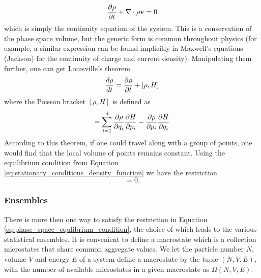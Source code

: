 \begin{equation}
  \frac{\partial \rho}{\partial t} + \nabla \cdot \rho {\bf v} = 0
\end{equation}
which is simply the continuity equation of the system. This is a conservation of the phase space volume, but the generic form is common throughout physics (for example, a similar expression can be found implicitly in Maxwell's equations (\cf Jackson\cite[page 3]{jackson_classical_1998}) for the continuity of charge and current density). Manipulating them further, one can get Louisville's theorem \cite{liouville_1985}
\begin{equation}
  \frac{d \rho}{d t} = \frac{\partial \rho}{\partial t} + [\rho, H]
\end{equation}
where the Poisson bracket $[ \rho, H ]$ is defined as
\begin{equation}
  [ \rho, H ] =
  \sum_{i=1}^{d}
  \pfrac{\rho}{q_i}
  \pfrac{H}{p_i}
  -
  \pfrac{\rho}{p_i}
  \pfrac{H}{q_i}
\end{equation}
According to this theorem, if one could travel along with a group of points, one would find that the local volume of points remains constant. Using the equilibrium condition from Equation \ref{eq:stationary_conditions_density_function} we have the restriction
\begin{equation}
  [ \rho, H ] = 0.
  \label{eq:phase_space_equlibrium_condition}
\end{equation}


\subsubsection{Ensembles}
\label{sec:ensemble}

There is more then one way to satisfy the restriction in Equation 
\ref{eq:phase_space_equlibrium_condition}, the choice of which leads to the various statistical ensembles. It is convenient to define a macrostate which is a collection microstates that share common aggregate values. We let the particle number $N$, volume $V$ and energy $E$ of a system define a macrostate by the tuple $(N,V,E)$, with the number of available microstates in a given macrostate as $\Omega(N,V,E)$. 

